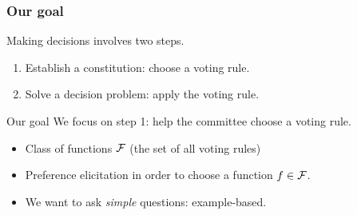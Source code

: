 \documentclass[english]{beamer}
\begin{document}
\begin{frame}
	\frametitle{Our goal}
	
	Making decisions involves two steps.
	\begin{enumerate}
		\item Establish a constitution: choose a voting rule.
		\item Solve a decision problem: apply the voting rule.
	\end{enumerate}
	
	\begin{block}{Our goal}
		We focus on step 1: help the committee choose a voting rule.
		\begin{itemize}
			\item Class of functions $\mathcal{F}$ (the set of all voting rules)
			\item Preference elicitation in order to choose a function $f \in \mathcal{F}$.
			\item We want to ask \emph{simple} questions: example-based.
		\end{itemize}
	\end{block}
\end{frame}
\end{document}
